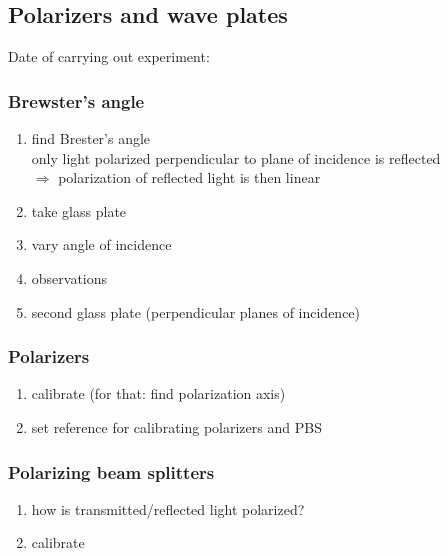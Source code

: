 \subsection{Polarizers and wave plates}
Date of carrying out experiment: 

\subsubsection{Brewster's angle}
\begin{enumerate}
    \item find Brester's angle \\
     only light polarized perpendicular to plane of incidence is reflected
     \\ $\Rightarrow$ polarization of reflected light is then linear
    \item take glass plate
    \item vary angle of incidence
    \item observations
    \item second glass plate (perpendicular planes of incidence)
\end{enumerate}

\subsubsection{Polarizers}
\begin{enumerate}
    \item calibrate (for that: find polarization axis)
    \item set reference for calibrating polarizers and PBS
\end{enumerate}

\subsubsection{Polarizing beam splitters}
\begin{enumerate}
    \item how is transmitted/reflected light polarized?
    \item calibrate
\end{enumerate}

